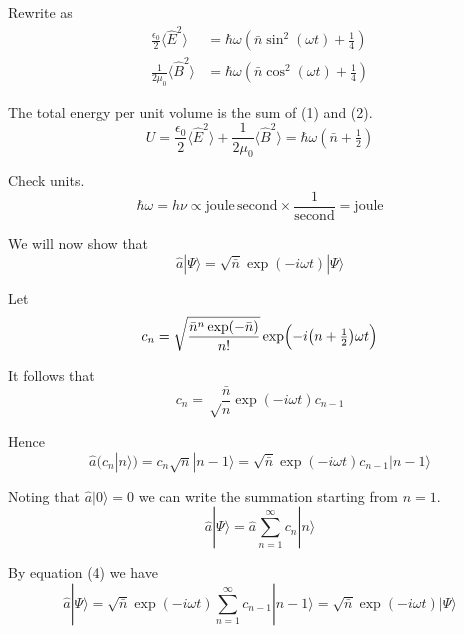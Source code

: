 Rewrite as
\begin{align*}
\frac{\epsilon_0}{2}\langle\hat E^2\rangle&=\hbar\omega\left(\bar n\sin^2(\omega t)+\tfrac{1}{4}\right)
\tag{1}
\\
\frac{1}{2\mu_0}\langle\hat B^2\rangle&=\hbar\omega\left(\bar n\cos^2(\omega t)+\tfrac{1}{4}\right)
\tag{2}
\end{align*}

The total energy per unit volume is the sum of (1) and (2).
\begin{equation*}
U=\frac{\epsilon_0}{2}\langle\hat E^2\rangle
+\frac{1}{2\mu_0}\langle\hat B^2\rangle
=\hbar\omega\left(\bar n+\tfrac{1}{2}\right)
\tag{3}
\end{equation*}

Check units.
\begin{equation*}
\hbar\omega=h\nu\propto\text{joule}\,\text{second}\times\frac{1}{\text{second}}=\text{joule}
\end{equation*}

We will now show that
\begin{equation*}
\hat a|\Psi\rangle=\sqrt{\bar n}\exp(-i\omega t)|\Psi\rangle
\end{equation*}

Let
\begin{equation*}
c_n=\sqrt{\frac{\bar n^n\exp(-\bar n)}{n!}}
\exp\Bigl(-i\bigl(n+\tfrac{1}{2}\bigr)\omega t\Bigr)
\end{equation*}

It follows that
\begin{equation*}
c_n=\sqrt\frac{\bar n}{n}\exp(-i\omega t)c_{n-1}
\end{equation*}

Hence
\begin{equation*}
\hat a\bigl(c_n|n\rangle\bigr)=c_n\sqrt{n}|n-1\rangle=\sqrt{\bar n}\exp(-i\omega t)c_{n-1}|n-1\rangle
\tag{4}
\end{equation*}

Noting that $\hat a|0\rangle=0$ we can write the summation starting from $n=1$.
\begin{equation*}
\hat a|\Psi\rangle=\hat a\sum_{n=1}^\infty c_n|n\rangle
\end{equation*}

By equation (4) we have
\begin{equation*}
\hat a|\Psi\rangle=\sqrt{\bar n}\exp(-i\omega t)\sum_{n=1}^\infty c_{n-1}|n-1\rangle
=\sqrt{\bar n}\exp(-i\omega t)|\Psi\rangle
\end{equation*}

